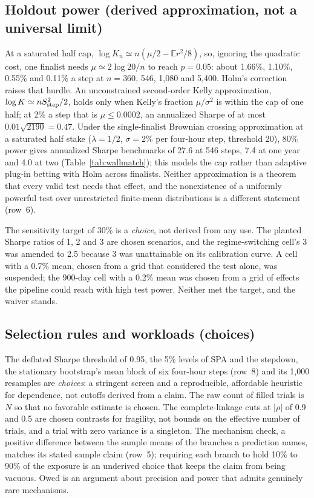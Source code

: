\documentclass[11pt]{article}
\newcommand{\E}{\mathbb{E}}
\begin{document}
\subsection{Holdout power (derived approximation, not a universal limit)}\label{app:power}

At a saturated half cap, $\log K_n\simeq n(\mu/2-\E r^2/8)$, so, ignoring the quadratic cost, one finalist needs $\mu\simeq2\log20/n$ to reach $p=0.05$: about 1.66\%, 1.10\%, 0.55\% and 0.11\% a step at $n=360$, 546, 1{,}080 and 5{,}400. Holm's correction raises that hurdle. An unconstrained second-order Kelly approximation, $\log K\simeq nS_{\rm step}^2/2$, holds only when Kelly's fraction $\mu/\sigma^2$ is within the cap of one half; at 2\% a step that is $\mu\le0.0002$, an annualized Sharpe of at most $0.01\sqrt{2190}=0.47$. Under the single-finalist Brownian crossing approximation at a saturated half stake ($\lambda=1/2$, $\sigma=2\%$ per four-hour step, threshold 20), 80\% power gives annualized Sharpe benchmarks of 27.6 at 546 steps, 7.4 at one year and 4.0 at two (Table~\ref{tab:wallmatch}); this models the cap rather than adaptive plug-in betting with Holm across finalists. Neither approximation is a theorem that every valid test needs that effect, and the nonexistence of a uniformly powerful test over unrestricted finite-mean distributions \cite{bahadur1956} is a different statement (row~6).

The sensitivity target of 30\% is a \emph{choice}, not derived from any use. The planted Sharpe ratios of 1, 2 and 3 are chosen scenarios, and the regime-switching cell's 3 was amended to 2.5 because 3 was unattainable on its calibration curve. A cell with a 0.7\% mean, chosen from a grid that considered the test alone, was suspended; the 900-day cell with a 0.2\% mean was chosen from a grid of effects the pipeline could reach with high test power. Neither met the target, and the waiver stands.

\subsection{Selection rules and workloads (choices)}\label{app:selection}

The deflated Sharpe threshold of 0.95, the 5\% levels of SPA and the stepdown, the stationary bootstrap's mean block of six four-hour steps (row~8) and its 1{,}000 resamples are \emph{choices}: a stringent screen and a reproducible, affordable heuristic for dependence, not cutoffs derived from a claim. The raw count of filled trials is $N$ so that no favorable estimate is chosen. The complete-linkage cuts at $|\rho|$ of 0.9 and 0.5 are chosen contrasts for fragility, not bounds on the effective number of trials, and a trial with zero variance is a singleton. The mechanism check, a positive difference between the sample means of the branches a prediction names, matches its stated sample claim (row~5); requiring each branch to hold 10\% to 90\% of the exposure is an underived choice that keeps the claim from being vacuous. Owed is an argument about precision and power that admits genuinely rare mechanisms.
\end{document}
